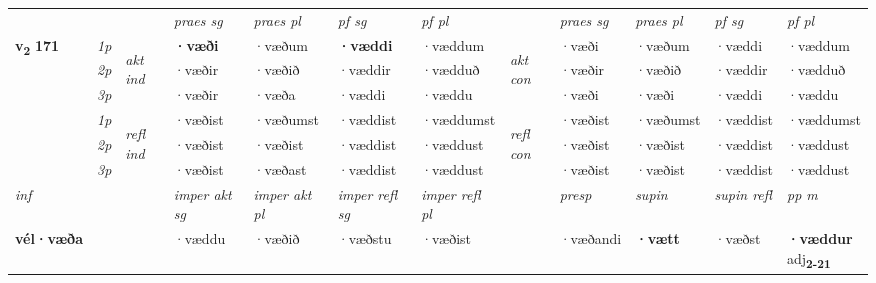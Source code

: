 \begin{longtable}[l]{X>{\footnotesize\itshape}llXXXXlXXXX}
 & &   & \textit{praes sg}  & \textit{praes pl}    & \textit{ pf sg} & \textit{pf pl} & & \textit{praes sg}  & \textit{praes pl}    & \textit{pf sg} & \textit{pf pl }  \\ \cmidrule{4-7} \cmidrule{9-12}
 \multirow{2}{*}{{{\textbf{v{\textsubscript{2}}} \Large{\textbf{171}}}}}  & 1p & \multirow{3}{*}{\begin{turn}{90}\textit{akt ind}\end{turn}} & \textbf{·væði} & ·væðum & \textbf{·væddi} & ·væddum & \multirow{3}{*}{\begin{turn}{90}\textit{akt con}\end{turn}} &·væði & ·væðum & ·væddi & ·væddum\\*
 & 2p &  &  ·væðir  & ·væðið & ·væddir & ·vædduð & & ·væðir & ·væðið & ·væddir & ·vædduð \\*
 & 3p &  & ·væðir & ·væða & ·væddi & ·væddu & & ·væði & ·væði& ·væddi & ·væddu \\*
\cmidrule{4-7} \cmidrule{9-12}
 & 1p & \multirow{3}{*}{\begin{turn}{90}\textit{refl ind}\end{turn}}  & ·væðist & ·væðumst & ·væddist & ·væddumst & \multirow{3}{*}{\begin{turn}{90}\textit{refl con}\end{turn}}  &·væðist & ·væðumst & ·væddist & ·væddumst \\*
 & 2p &  & ·væðist & ·væðist & ·væddist & ·væddust & &·væðist & ·væðist & ·væddist & ·væddust \\*
 & 3p  & & ·væðist & ·væðast & ·væddist & ·væddust & & ·væðist & ·væðist& ·væddist & ·væddust \\*
\cmidrule{4-7} \cmidrule{9-12}

   {\textit{inf}} & &  & \textit{imper akt sg} & \textit{imper akt pl} & \textit{imper refl sg} & \textit{imper refl pl} && \textit{presp} & \textit{supin} & \textit{supin refl} & \textit{pp m} \\*
  {\textbf{vél\allowbreak ·væða}} & && ·væddu  & ·væðið & ·væðstu & ·væðist && ·væðandi &  \textbf{·vætt} & ·væðst & \specialcell{\textbf{·væddur} \\ adj\textbf{\textsubscript{2-21}}} \\*

\midrule


\end{longtable}
